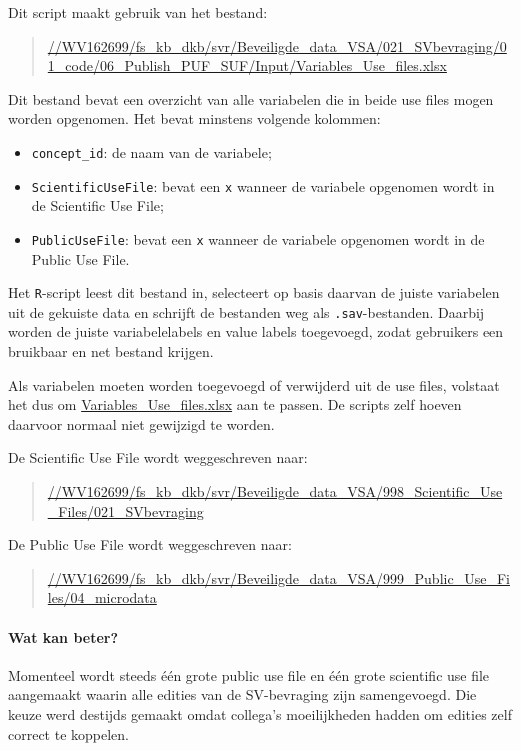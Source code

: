 \documentclass{VSAnote}
\begin{document}
Dit script maakt gebruik van het bestand:
\begin{quote}
\url{//WV162699/fs_kb_dkb/svr/Beveiligde_data_VSA/021_SVbevraging/01_code/06_Publish_PUF_SUF/Input/Variables_Use_files.xlsx}
\end{quote}

Dit bestand bevat een overzicht van alle variabelen die in beide use files mogen worden opgenomen. Het bevat minstens volgende kolommen:
\begin{itemize}
\item \verb+concept_id+: de naam van de variabele;
\item \verb+ScientificUseFile+: bevat een \verb+x+ wanneer de variabele opgenomen wordt in de Scientific Use File;
\item \verb+PublicUseFile+: bevat een \verb+x+ wanneer de variabele opgenomen wordt in de Public Use File.
\end{itemize}

Het \verb+R+-script leest dit bestand in, selecteert op basis daarvan de juiste variabelen uit de gekuiste data en schrijft de bestanden weg als \texttt{.sav}-bestanden. Daarbij worden de juiste variabelelabels en value labels toegevoegd, zodat gebruikers een bruikbaar en net bestand krijgen.

Als variabelen moeten worden toegevoegd of verwijderd uit de use files, volstaat het dus om \url{Variables_Use_files.xlsx} aan te passen. De scripts zelf hoeven daarvoor normaal niet gewijzigd te worden.

De Scientific Use File wordt weggeschreven naar:
\begin{quote}
\url{//WV162699/fs_kb_dkb/svr/Beveiligde_data_VSA/998_Scientific_Use_Files/021_SVbevraging}
\end{quote}

De Public Use File wordt weggeschreven naar:
\begin{quote}
\url{//WV162699/fs_kb_dkb/svr/Beveiligde_data_VSA/999_Public_Use_Files/04_microdata}
\end{quote}

\paragraph{Wat kan beter?}

Momenteel wordt steeds één grote public use file en één grote scientific use file aangemaakt waarin alle edities van de SV-bevraging zijn samengevoegd. Die keuze werd destijds gemaakt omdat collega's moeilijkheden hadden om edities zelf correct te koppelen.
\end{document}
